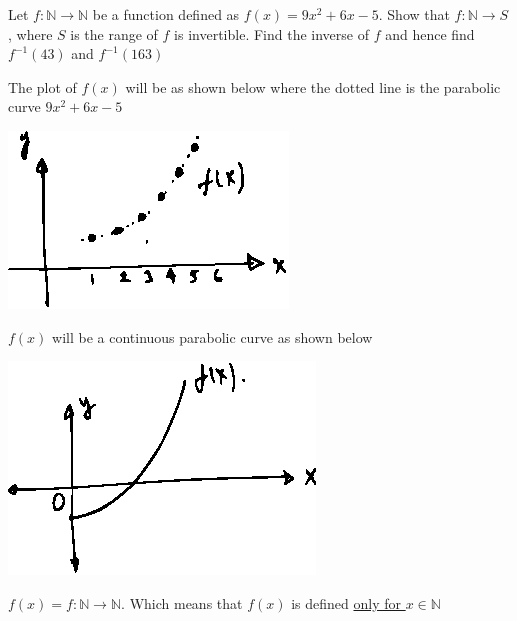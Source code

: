 \documentclass[14pt,fleqn]{extarticle}
\newcommand\N{\mathbb{N}}
\newcommand\fx{9x^2+6x-5}
\begin{document}
 
\begin{problem}
	\statement 

Let $f:\N\to\N$ be a function defined as $f(x) = \fx$. Show that 
$f:\N\to S$, where $S$ is the range of $f$ is invertible. Find the 
inverse of $f$ and hence find $f^{-1}(43)$ and $f^{-1}(163)$ 
      
      \begin{step}
  \begin{options} 
     \correct 
       
       The plot of $f(x)$ will be as shown below where the dotted line 
       is the parabolic curve $\fx$ 
       
       \begin{center}
\includegraphics[scale=1.5]{1427-C.eps}
\end{center}
       
     \incorrect
     
     $f(x)$ will be a continuous parabolic curve as shown below 
     
     \begin{center}
\includegraphics[scale=1.5]{1427-A.eps}
\end{center}
        
    \end{options} 
     \reason 
     
     $f(x) = f:\N\to\N$. Which means that $f(x)$ is defined \underline{only for $x\in\N$}\newline 
     

\end{step}
\end{problem}
\end{document}
